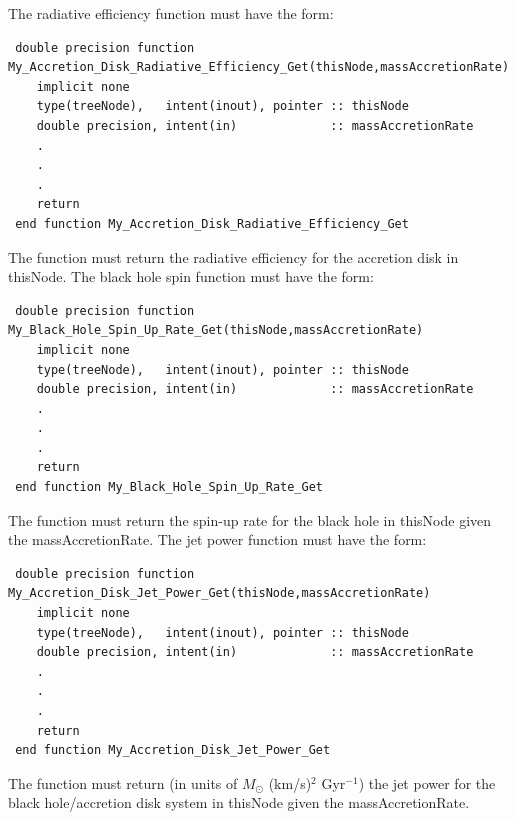 The radiative efficiency function must have the form:
\begin{verbatim}
 double precision function My_Accretion_Disk_Radiative_Efficiency_Get(thisNode,massAccretionRate)
    implicit none
    type(treeNode),   intent(inout), pointer :: thisNode
    double precision, intent(in)             :: massAccretionRate
    .
    .
    .
    return
 end function My_Accretion_Disk_Radiative_Efficiency_Get
\end{verbatim}
The function must return the radiative efficiency for the accretion disk in {\normalfont \ttfamily thisNode}. The black hole spin function must have the form:
\begin{verbatim}
 double precision function My_Black_Hole_Spin_Up_Rate_Get(thisNode,massAccretionRate)
    implicit none
    type(treeNode),   intent(inout), pointer :: thisNode
    double precision, intent(in)             :: massAccretionRate
    .
    .
    .
    return
 end function My_Black_Hole_Spin_Up_Rate_Get
\end{verbatim}
The function must return the spin-up rate for the black hole in {\normalfont \ttfamily thisNode} given the {\normalfont \ttfamily massAccretionRate}. The jet power function must have the form:
\begin{verbatim}
 double precision function My_Accretion_Disk_Jet_Power_Get(thisNode,massAccretionRate)
    implicit none
    type(treeNode),   intent(inout), pointer :: thisNode
    double precision, intent(in)             :: massAccretionRate
    .
    .
    .
    return
 end function My_Accretion_Disk_Jet_Power_Get
\end{verbatim}
The function must return (in units of $M_\odot$ (km/s)$^2$ Gyr$^{-1}$) the jet power for the black hole/accretion disk system in {\normalfont \ttfamily thisNode} given the {\normalfont \ttfamily massAccretionRate}.

